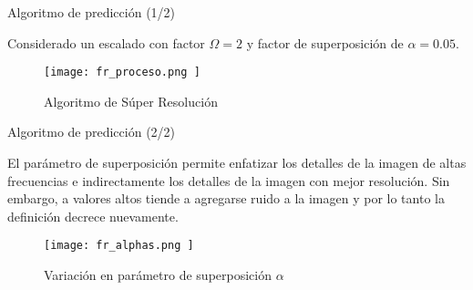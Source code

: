 \begin{frame}{Algoritmo de predicción (1/2)}

    Considerado un escalado con factor  $\Omega=2$ y factor de
    superposición de $\alpha=0.05$.

    \begin{figure}[H]
        \texttt{[image:  fr\_proceso.png ]}
        \centering
        \caption{ Algoritmo de Súper Resolución}
        \label{fig:fr_proceso}
    \end{figure}

\end{frame}

\begin{frame}{Algoritmo de predicción (2/2)}

    El parámetro de superposición permite enfatizar los detalles de
    la imagen de altas frecuencias e indirectamente los detalles de la
    imagen con mejor resolución. Sin embargo, a valores altos tiende a agregarse
    ruido a la imagen y por lo tanto la definición decrece nuevamente.

    \begin{figure}[H]
        \texttt{[image:  fr\_alphas.png ]}
        \centering
        \caption{ Variación en parámetro de superposición $\alpha$ }
        \label{fig:fr_alphas}
    \end{figure}

\end{frame}